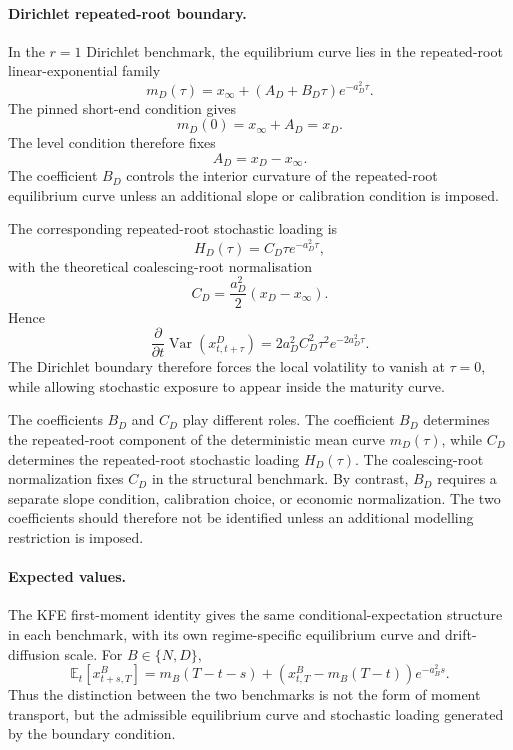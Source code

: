 \documentclass[11pt]{article}
\newcommand{\Var}{\operatorname{Var}}
\newcommand{\E}{\mathbb{E}}
\numberwithin{equation}{section}
\begin{document}
\paragraph{Dirichlet repeated-root boundary.}
In the $r=1$ Dirichlet benchmark, the equilibrium curve lies in the repeated-root linear-exponential family
\begin{equation}
m_D(\tau)=x_\infty+(A_D+B_D\tau)e^{-a_D^2\tau}.
\end{equation}
The pinned short-end condition gives
\begin{equation}
m_D(0)=x_\infty+A_D=x_D.
\end{equation}
The level condition therefore fixes
\begin{equation}
A_D=x_D-x_\infty.
\end{equation}
The coefficient $B_D$ controls the interior curvature of the repeated-root equilibrium curve unless an additional slope or calibration condition is imposed.

The corresponding repeated-root stochastic loading is
\begin{equation}
H_D(\tau)=C_D\tau e^{-a_D^2\tau},
\end{equation}
with the theoretical coalescing-root normalisation
\begin{equation}
C_D=\frac{a_D^2}{2}(x_D-x_\infty).
\end{equation}
Hence
\begin{equation}
\frac{\partial}{\partial t}\Var(x^D_{t,t+\tau})
=
2a_D^2C_D^2\tau^2e^{-2a_D^2\tau}.
\end{equation}
The Dirichlet boundary therefore forces the local volatility to vanish at $\tau=0$, while allowing stochastic exposure to appear inside the maturity curve.

The coefficients $B_D$ and $C_D$ play different roles. The coefficient $B_D$ determines the repeated-root component of the deterministic mean curve $m_D(\tau)$, while $C_D$ determines the repeated-root stochastic loading $H_D(\tau)$. The coalescing-root normalization fixes $C_D$ in the structural benchmark. By contrast, $B_D$ requires a separate slope condition, calibration choice, or economic normalization. The two coefficients should therefore not be identified unless an additional modelling restriction is imposed.

\paragraph{Expected values.}
The KFE first-moment identity gives the same conditional-expectation structure in each benchmark, with its own regime-specific equilibrium curve and drift-diffusion scale. For $B\in\{N,D\}$,
\begin{equation}
\E_t[x^B_{t+s,T}]
=
 m_B(T-t-s)
+
\left(x^B_{t,T}-m_B(T-t)\right)e^{-a_B^2s}.
\end{equation}
Thus the distinction between the two benchmarks is not the form of moment transport, but the admissible equilibrium curve and stochastic loading generated by the boundary condition.
\end{document}
